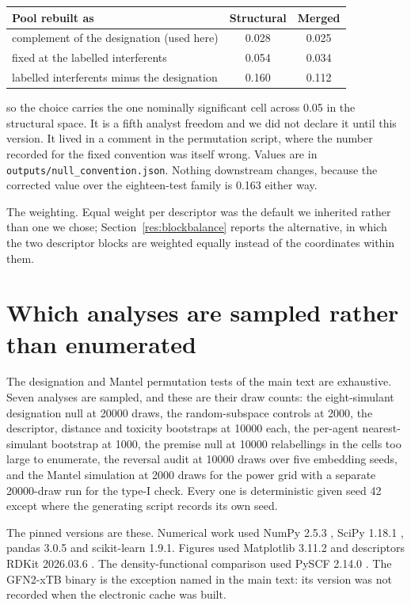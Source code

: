 \documentclass[11pt,a4paper]{article}
\begin{document}
\begin{center}
\begin{tabular}{lcc}
\toprule
Pool rebuilt as & Structural & Merged \\
\midrule
complement of the designation (used here) & 0.028 & 0.025 \\
fixed at the labelled interferents        & 0.054 & 0.034 \\
labelled interferents minus the designation & 0.160 & 0.112 \\
\bottomrule
\end{tabular}
\end{center}

\noindent so the choice carries the one nominally significant cell across 0.05
in the structural space. It is a fifth analyst freedom and we did not declare it
until this version. It lived in a comment in the permutation script, where the
number recorded for the fixed convention was itself wrong. Values are in
\texttt{outputs/\allowbreak null\_\allowbreak convention.json}. Nothing downstream changes, because the
corrected value over the eighteen-test family is 0.163 either way.

The weighting. Equal weight per descriptor was the default we inherited rather
than one we chose; Section~\ref{res:blockbalance} reports the alternative, in
which the two descriptor blocks are weighted equally instead of the coordinates
within them.

\section{Which analyses are sampled rather than enumerated}
\label{meth:sampling}

The designation and Mantel permutation tests of the main text are exhaustive.
Seven analyses are sampled, and these are their draw counts: the eight-simulant
designation null at 20000 draws, the random-subspace controls at 2000, the
descriptor, distance and toxicity bootstraps at 10000 each, the per-agent
nearest-simulant bootstrap at 1000, the premise null at 10000 relabellings in
the cells too large to enumerate, the reversal audit at 10000 draws over five
embedding seeds, and the Mantel simulation at 2000 draws for the power grid with
a separate 20000-draw run for the type-I check. Every one is deterministic given
seed 42 except where the generating script records its own seed.

The pinned versions are these. Numerical work used NumPy 2.5.3
\cite{numpy2020}, SciPy 1.18.1 \cite{scipy2020}, pandas 3.0.5
\cite{mckinney2010} and scikit-learn 1.9.1. Figures used Matplotlib 3.11.2
\cite{matplotlib2007} and descriptors RDKit 2026.03.6 \cite{rdkit}. The
density-functional comparison used PySCF 2.14.0 \cite{pyscf2020}. The GFN2-xTB binary
is the exception named in the main text: its version was not recorded when the
electronic cache was built.
\end{document}
